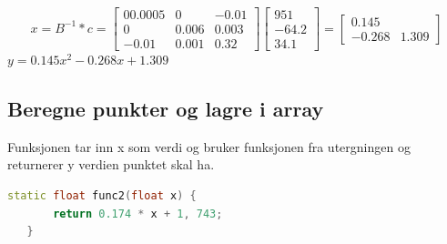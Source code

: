 \documentclass[a4paper,norsk]{article}
\begin{document}
\begin{equation*}
x = B^{-1} * c = \begin{bmatrix} 00.0005  & 0 & -0.01\\ 0 & 0.006 & 0.003 \\ -0.01 & 0.001 & 0.32  \end{bmatrix}\begin{bmatrix} 951 \\ -64.2 \\ 34.1\end{bmatrix}
= \begin{bmatrix}0.145  \\ -0.268 & 1.309 \end{bmatrix}
\end{equation*}
$y = 0.145x^{2}-0.268x+1.309$
\subsection{Beregne punkter og lagre i array}
Funksjonen tar inn x som verdi og bruker funksjonen fra utergningen og returnerer y verdien punktet skal ha.
\begin{lstlisting}[language=C++, caption={trianglesurface.h}]
static float func2(float x) {
       return 0.174 * x + 1, 743;
   }
\end{lstlisting}
\end{document}
